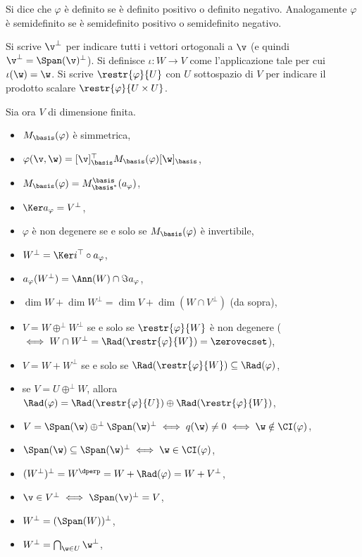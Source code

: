 \documentclass[10pt,landscape]{article}
\begin{document}
\begin{multicols}{3}
		Si dice che $\varphi$ è definito se è definito positivo o definito negativo. Analogamente $\varphi$
		è semidefinito se è semidefinito positivo o semidefinito negativo.
		
		Si scrive $\v^\perp$ per indicare tutti i vettori ortogonali a $\v$ (e quindi
		$\v^\perp = \Span(\v)^\perp$). Si definisce $\iota : W \to V$ come l'applicazione
		tale per cui $\iota(\w) = \w$. Si scrive $\restr{\varphi}{U}$ con $U$ sottospazio
		di $V$ per indicare il prodotto scalare $\restr{\varphi}{U \times U}$.
		
		Sia ora $V$ di dimensione finita.
		
		\begin{itemize}
			\item $M_\basis(\varphi)$ è simmetrica,
			\item $\varphi(\v, \w) = [\v]_\basis^\top M_\basis(\varphi) [\w]_\basis$,
			\item $M_\basis(\varphi) = M^\basis_{\basis^*}(a_\varphi)$,
			\item $\Ker a_\varphi = V^\perp$,
			\item $\varphi$ è non degenere se e solo se $M_\basis(\varphi)$ è invertibile,
			\item $W^\perp = \Ker i^\top \circ a_\varphi$,
			\item $a_\varphi(W^\perp) = \Ann(W) \cap \Im a_\varphi$,
			\item $\dim W + \dim W^\perp = \dim V + \dim (W \cap V^\perp)$ (da sopra),
			\item $V = W \oplus^\perp W^\perp$ se e solo se $\restr{\varphi}{W}$ è non degenere ($\iff W \cap W^\perp = \Rad(\restr{\varphi}{W}) = \zerovecset$),
			\item $V = W + W^\perp$ se e solo se $\Rad(\restr{\varphi}{W}) \subseteq \Rad(\varphi)$,
			\item se $V = U \oplus^\perp W$, allora $\Rad(\varphi) = \Rad(\restr{\varphi}{U}) \oplus \Rad(\restr{\varphi}{W})$,
			\item $V = \Span(\w) \oplus^\perp \Span(\w)^\perp \iff q(\w) \neq 0 \iff \w \notin \CI(\varphi)$,
			\item $\Span(\w) \subseteq \Span(\w)^\perp \iff \w \in \CI(\varphi)$,
			\item $(W^\perp)^\perp = W^\dperp = W + \Rad(\varphi) = W + V^\perp$,
			\item $\v \in V^\perp \iff \Span(\v)^\perp = V$,
			\item $W^\perp = (\Span(W))^\perp$,
			\item $W^\perp = \bigcap_{\w \in U} \w^\perp$,

\end{itemize}
\end{multicols}
\end{document}
